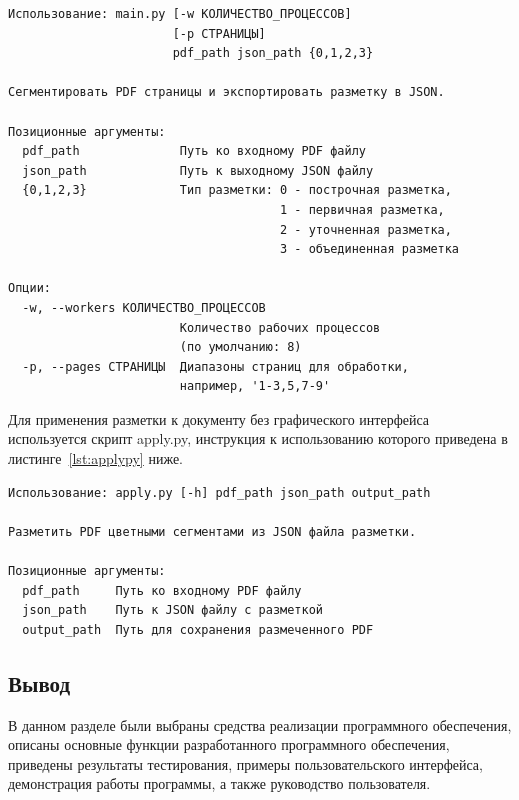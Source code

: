 \begin{lstlisting}[caption={Запуск скрипта для создания разметки}, label={lst:mainpy}]
Использование: main.py [-w КОЛИЧЕСТВО_ПРОЦЕССОВ]
                       [-p СТРАНИЦЫ]
                       pdf_path json_path {0,1,2,3}

Сегментировать PDF страницы и экспортировать разметку в JSON.

Позиционные аргументы:
  pdf_path              Путь ко входному PDF файлу
  json_path             Путь к выходному JSON файлу
  {0,1,2,3}             Тип разметки: 0 - построчная разметка,
                                      1 - первичная разметка,
                                      2 - уточненная разметка,
                                      3 - объединенная разметка

Опции:
  -w, --workers КОЛИЧЕСТВО_ПРОЦЕССОВ
                        Количество рабочих процессов
                        (по умолчанию: 8)
  -p, --pages СТРАНИЦЫ  Диапазоны страниц для обработки,
                        например, '1-3,5,7-9'
\end{lstlisting}

Для применения разметки к документу без графического интерфейса используется скрипт apply.py, инструкция к использованию которого приведена в листинге~\ref{lst:applypy} ниже.
\begin{lstlisting}[caption={Запуск скрипта для применения разметки к PDF документу}, label={lst:applypy}]
Использование: apply.py [-h] pdf_path json_path output_path

Разметить PDF цветными сегментами из JSON файла разметки.

Позиционные аргументы:
  pdf_path     Путь ко входному PDF файлу
  json_path    Путь к JSON файлу с разметкой
  output_path  Путь для сохранения размеченного PDF
\end{lstlisting}

\newpage

\subsection*{Вывод}

В данном разделе были выбраны средства реализации программного обеспечения, описаны основные функции разработанного программного обеспечения, приведены результаты тестирования, примеры пользовательского интерфейса, демонстрация работы программы, а также руководство пользователя.
